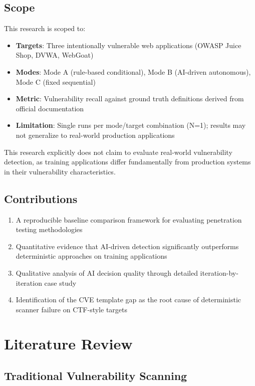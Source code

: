 \documentclass[12pt,a4paper,oneside]{book}
\begin{document}
\section{Scope}

This research is scoped to:
\begin{itemize}
    \item \textbf{Targets}: Three intentionally vulnerable web applications (OWASP Juice Shop, DVWA, WebGoat)
    \item \textbf{Modes}: Mode A (rule-based conditional), Mode B (AI-driven autonomous), Mode C (fixed sequential)
    \item \textbf{Metric}: Vulnerability recall against ground truth definitions derived from official documentation
    \item \textbf{Limitation}: Single runs per mode/target combination (N=1); results may not generalize to real-world production applications
\end{itemize}

This research explicitly does not claim to evaluate real-world vulnerability detection, as training applications differ fundamentally from production systems in their vulnerability characteristics.

\section{Contributions}

\begin{enumerate}
    \item A reproducible baseline comparison framework for evaluating penetration testing methodologies
    \item Quantitative evidence that AI-driven detection significantly outperforms deterministic approaches on training applications
    \item Qualitative analysis of AI decision quality through detailed iteration-by-iteration case study
    \item Identification of the CVE template gap as the root cause of deterministic scanner failure on CTF-style targets
\end{enumerate}

\chapter{Literature Review}

\section{Traditional Vulnerability Scanning}
\end{document}

